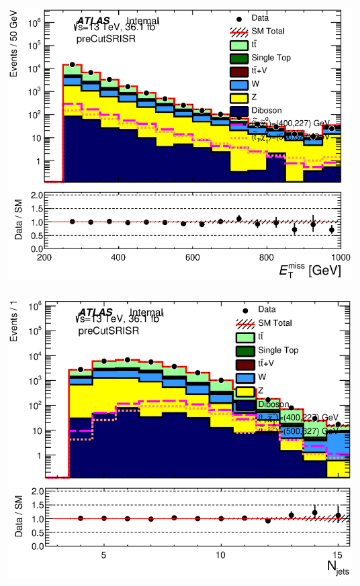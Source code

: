\begin{figure}[h!]
  \begin{center}
      \begin{subfigure}[b]{0.40\textwidth}    
    	 \includegraphics[width=\textwidth]{figures/plotRegion/Met_preCutSRISR_log.eps}
                \caption{ }
    \end{subfigure}
        \begin{subfigure}[b]{0.40\textwidth}    
    	 \includegraphics[width=\textwidth]{figures/plotRegion/NJets_preCutSRISR_log.eps}
                \caption{ }
    \end{subfigure}

\end{center}
\end{figure}
